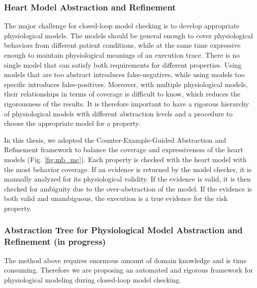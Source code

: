 \documentclass[a4paper]{article}
\begin{document}
\subsubsection{Heart Model Abstraction and Refinement}

The major challenge for closed-loop model checking is to develop appropriate physiological models. 
The models should be general enough to cover physiological behaviors from different patient conditions, while at the same time expressive enough to maintain physiological meanings of an execution trace.
There is no single model that can satisfy both requirements for different properties.
Using models that are too abstract introduces false-negatives, while using models too specific introduces false-positives.
Moreover, with multiple physiological models, their relationships in terms of coverage is difficult to know, which reduces the rigorousness of the results.
It is therefore important to have a rigorous hierarchy of physiological models with different abstraction levels and a procedure to choose the appropriate model for a property.

In this thesis, we adopted the Counter-Example-Guided Abstraction and Refinement framework to balance the coverage and expressiveness of the heart models (Fig. \ref{fig:mb_mc}).
Each property is checked with the heart model with the most behavior coverage.
If an evidence is returned by the model checker, it is manually analyzed for its physiological validity.
If the evidence is valid, it is then checked for ambiguity due to the over-abstraction of the model. 
If the evidence is both valid and unambiguous, the execution is a true evidence for the risk property.
\subsubsection{Abstraction Tree for Physiological Model Abstraction and Refinement (in progress)}
The method above requires enormous amount of domain knowledge and is time consuming.
Therefore we are proposing an automated and rigorous framework for physiological modeling during closed-loop model checking.
\end{document}
